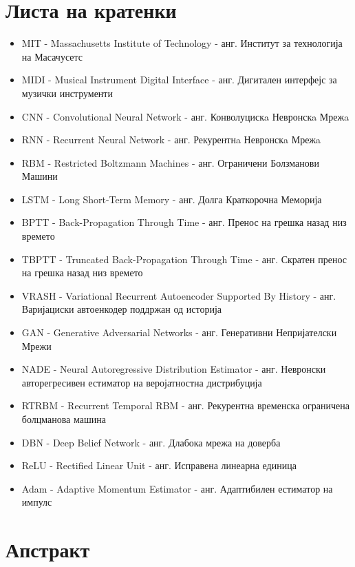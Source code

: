 \chapter*{Листа на кратенки}

\begin{itemize}
    \item MIT - Massachusetts Institute of Technology - анг. Институт за технологија на Масачусетс
    \item MIDI - Musical Instrument Digital Interface - анг. Дигитален интерфејс за музички инструменти
    \item CNN - Convolutional Neural Network - анг. Конволуцискa Невронскa Мрежa
    \item RNN - Recurrent Neural Network - анг. Рекурентнa Невронскa Мрежa
    \item RBM - Restricted Boltzmann Machines - анг. Ограничени Болзманови Машини
    \item LSTM - Long Short-Term Memory - анг. Долга Краткорочна Меморија
    \item BPTT - Back-Propagation Through Time - анг. Пренос на грешка назад низ времето
    \item TBPTT - Truncated Back-Propagation Through Time - анг. Скратен пренос на грешка назад низ времето
    \item VRASH - Variational Recurrent Autoencoder Supported By History - анг. Варијациски автоенкодер поддржан од историја
    \item GAN - Generative Adversarial Networks - анг. Генеративни Непријателски Мрежи
    \item NADE - Neural Autoregressive Distribution Estimator - анг. Невронски авторегресивен естиматор на веројатностна дистрибуција
    \item RTRBM - Recurrent Temporal RBM - анг. Рекурентна временска ограничена болцманова машина
    \item DBN - Deep Belief Network - анг. Длабока мрежа на доверба
    \item ReLU - Rectified Linear Unit - анг. Исправена линеарна единица 
    \item Adam - Adaptive Momentum Estimator - анг. Адаптибилен естиматор на импулс
\end{itemize}

\newpage

\chapter*{Апстракт}

